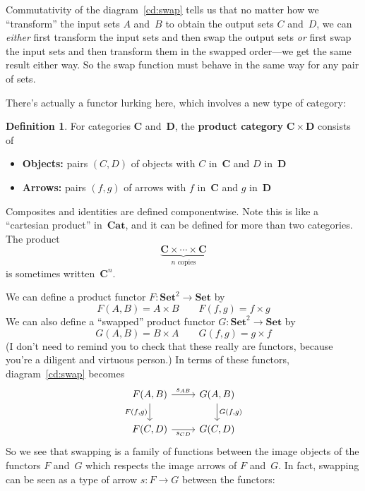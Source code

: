 \documentclass[letterpaper,12pt]{article}
\newcommand{\cat}[1]{\mathbf{#1}}
\newcommand{\Cat}{\cat{Cat}}
\newcommand{\Set}{\cat{Set}}
\newcommand{\textdefn}{\textbf}
\theoremstyle{definition}
\newtheorem{defn}[equation]{Definition}
\theoremstyle{plain}
\numberwithin{equation}{section}
\begin{document}
Commutativity of the diagram~\eqref{cd:swap} tells us that no matter how we ``transform'' the input sets \(A\) and~\(B\) to obtain the output sets \(C\) and~\(D\), we can \emph{either} first transform the input sets and then swap the output sets \emph{or} first swap the input sets and then transform them in the swapped order---we get the same result either way. So the swap function must behave in the same way for any pair of sets.

There's actually a functor lurking here, which involves a new type of category:
\begin{defn}
For categories \(\cat{C}\) and~\(\cat{D}\), the \textdefn{product category} \(\cat{C}\times\cat{D}\) consists of
\begin{itemize}
\item \textbf{Objects:} pairs \((C,D)\) of objects with \(C\) in~\(\cat{C}\) and \(D\) in~\(\cat{D}\)
\item \textbf{Arrows:} pairs \((f,g)\) of arrows with \(f\) in~\(\cat{C}\) and \(g\) in~\(\cat{D}\)
\end{itemize}
Composites and identities are defined componentwise. Note this is like a ``cartesian product'' in~\(\Cat\), and it can be defined for more than two categories. The product
\[\underbrace{\cat{C}\times\cdots\times\cat{C}}_{n\text{ copies}}\]
is sometimes written~\(\cat{C}^n\).
\label{defn:productcat}
\end{defn}
\noindent We can define a product functor \(F:\Set^2\to\Set\) by
\[F(A,B)=A\times B\qquad F(f,g)=f\times g\]
We can also define a ``swapped'' product functor \(G:\Set^2\to\Set\) by
\[G(A,B)=B\times A\qquad G(f,g)=g\times f\]
(I don't need to remind you to check that these really are functors, because you're a diligent and virtuous person.) In terms of these functors, diagram~\eqref{cd:swap} becomes
\begin{equation}
\begin{tikzcd}
F(A,B) \ar[d, "{F(f,g)}"'] \ar[r, "s_{AB}"] & G(A,B) \ar[d, "{G(f,g)}"] \\
F(C,D) \ar[r, "s_{CD}"'] & G(C,D)
\end{tikzcd}
\label{cd:swapfunc}
\end{equation}
So we see that swapping is a family of functions between the image objects of the functors \(F\) and~\(G\) which respects the image arrows of \(F\) and~\(G\). In fact, swapping can be seen as a type of arrow \(s:F\to G\) between the functors:
\end{document}
